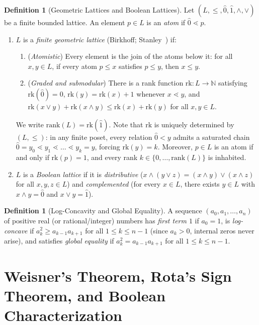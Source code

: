 \documentclass[11pt]{article}
\theoremstyle{definition}
\newtheorem{definition}[theorem]{Definition}
\theoremstyle{remark}
\newcommand{\rk}{\mathrm{rk}}
\newcommand{\hatzero}{\hat{0}}
\newcommand{\hatone}{\hat{1}}
\newcommand{\N}{\mathbb{N}}
\begin{document}
\begin{definition}[Geometric Lattices and Boolean Lattices]
Let $(L, \le, \hatzero, \hatone, \wedge, \vee)$ be a finite bounded lattice. An element $p \in L$ is an \emph{atom} if $\hatzero \lessdot p$.
\begin{enumerate}
  \item $L$ is a \emph{finite geometric lattice} (Birkhoff; Stanley~\cite[\S 3.3]{StanleyEC1}) if:
  \begin{enumerate}
    \item (\emph{Atomistic}) Every element is the join of the atoms below it: for all $x, y \in L$, if every atom $p \le x$ satisfies $p \le y$, then $x \le y$.
    \item (\emph{Graded and submodular}) There is a rank function $\rk : L \to \N$ satisfying $\rk(\hatzero) = 0$, $\rk(y) = \rk(x) + 1$ whenever $x \lessdot y$, and $\rk(x \vee y) + \rk(x \wedge y) \le \rk(x) + \rk(y)$ for all $x, y \in L$.
  \end{enumerate}
  We write $\mathrm{rank}(L) = \rk(\hatone)$. Note that $\rk$ is uniquely determined by $(L, \le)$: in any finite poset, every relation $\hatzero < y$ admits a saturated chain $\hatzero = y_0 \lessdot y_1 \lessdot \dots \lessdot y_k = y$, forcing $\rk(y) = k$. Moreover, $p \in L$ is an atom if and only if $\rk(p) = 1$, and every rank $k \in \{0,\dots,\mathrm{rank}(L)\}$ is inhabited.
  \item $L$ is a \emph{Boolean lattice} if it is \emph{distributive} ($x \wedge (y \vee z) = (x \wedge y) \vee (x \wedge z)$ for all $x,y,z \in L$) and \emph{complemented} (for every $x \in L$, there exists $y \in L$ with $x \wedge y = \hatzero$ and $x \vee y = \hatone$).
\end{enumerate}
\end{definition}

\begin{definition}[Log-Concavity and Global Equality]
A sequence $(a_0, a_1, \dots, a_n)$ of positive real (or rational/integer) numbers has \emph{first term $1$} if $a_0 = 1$, is \emph{log-concave} if $a_k^2 \ge a_{k-1} a_{k+1}$ for all $1 \le k \le n - 1$ (since $a_k > 0$, internal zeros never arise), and satisfies \emph{global equality} if $a_k^2 = a_{k-1} a_{k+1}$ for all $1 \le k \le n - 1$.
\end{definition}

\section{Weisner's Theorem, Rota's Sign Theorem, and Boolean Characterization}
\end{document}
